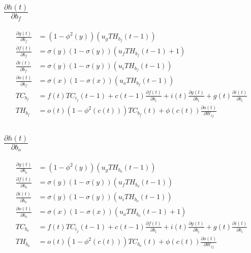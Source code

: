 \documentclass[twoside,11pt]{article}
\begin{document}
\subsection{$\frac{\partial h(t)}{\partial b_{f}}$}

\begin{equation}
\begin{aligned}
\frac{\partial g(t)}{\partial b_{f}} &=  
(1-\phi^2(y))(u_g TH_{b_{f}}(t-1))  \\
\frac{\partial f(t)}{\partial b_{f}} &=  \sigma(y)(1-\sigma(y))( u_f TH_{b_{f}}(t-1) + 1 ) \\
\frac{\partial i(t)}{\partial b_{f}}  &= \sigma(y)(1-\sigma(y))( u_i TH_{b_{f}}(t-1))  \\
\frac{\partial o(t)}{\partial b_{f}} &=  \sigma(x)(1-\sigma(x))( u_o TH_{b_{f}}(t-1))  \\
TC_{b_{f}}&= f(t) TC_{i_j}(t-1) + c(t-1)\frac{\partial f(t)}{ \partial b_i} + i(t)\frac{\partial g(t) }{\partial b_i}  + g(t)\frac{\partial i(t) }{\partial b_i}  \\
TH_{b_{f}}&= o(t) (1-\phi^{2}(c(t))) TC_{b_{f}}(t)  + \phi(c(t)) \frac{\partial o(t)}{\partial W_{ij}}  
\end{aligned}
\end{equation}

\subsection{$\frac{\partial h(t)}{\partial b_{o}}$}

\begin{equation}
\begin{aligned}
\frac{\partial g(t)}{\partial b_{o}} &=  
(1-\phi^2(y))(u_g TH_{b_{o}}(t-1))  \\
\frac{\partial f(t)}{\partial b_{o}} &=  \sigma(y)(1-\sigma(y))( u_f TH_{b_{o}}(t-1)) \\
\frac{\partial i(t)}{\partial b_{o}}  &= \sigma(y)(1-\sigma(y))( u_i TH_{b_{o}}(t-1))  \\
\frac{\partial o(t)}{\partial b_{o}} &=  \sigma(x)(1-\sigma(x))( u_o TH_{b_{o}}(t-1) + 1 )  \\
TC_{b_{o}}&= f(t) TC_{i_j}(t-1) + c(t-1)\frac{\partial f(t)}{ \partial b_i} + i(t)\frac{\partial g(t) }{\partial b_i}  + g(t)\frac{\partial i(t) }{\partial b_i}  \\
TH_{b_{o}}&= o(t) (1-\phi^{2}(c(t))) TC_{b_{o}}(t)  + \phi(c(t)) \frac{\partial o(t)}{\partial W_{ij}}  
\end{aligned}
\end{equation}


\end{document}
